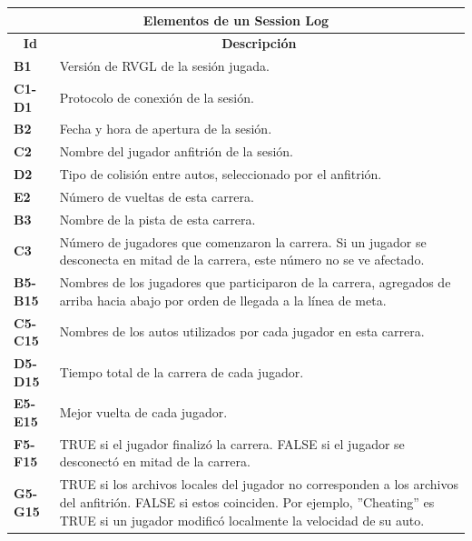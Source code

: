 \begin{center}
	\begin{tabular}{ | l | p{13cm} |}
		\hline
		\multicolumn{2}{|c|}{\textbf{Elementos de un Session Log}} \\
		\hline
		\multicolumn{1}{|c|}{\textbf{Id}} & \multicolumn{1}{|c|}{\textbf{Descripción}} \\
		\hline
		{\textbf{B1}} & Versión de RVGL de la sesión jugada. \\ \hline
		
		{\textbf{C1-D1}} & Protocolo de conexión de la sesión. \\ \hline
		
		{\textbf{B2}} & Fecha y hora de apertura de la sesión. \\ \hline
		
		{\textbf{C2}} & Nombre del jugador anfitrión de la sesión. \\ \hline
		
		{\textbf{D2}} & Tipo de colisión entre autos, seleccionado por el anfitrión. \\ \hline
		
		{\textbf{E2}} & Número de vueltas de esta carrera. \\ \hline
		
		{\textbf{B3}} & Nombre de la pista de esta carrera. \\ \hline
		
		{\textbf{C3}} & Número de jugadores que comenzaron la carrera. Si un jugador se desconecta en mitad de la carrera, este número no se ve afectado. \\ \hline
		
		{\textbf{B5-B15}} & Nombres de los jugadores que participaron de la carrera, agregados de arriba hacia abajo por orden de llegada a la línea de meta. \\ \hline
		
		{\textbf{C5-C15}} & Nombres de los autos utilizados por cada jugador en esta carrera. \\ \hline
		
		{\textbf{D5-D15}} & Tiempo total de la carrera de cada jugador.\\ \hline
		
		{\textbf{E5-E15}} & Mejor vuelta de cada jugador.\\ \hline
		
		{\textbf{F5-F15}} & TRUE si el jugador finalizó la carrera. FALSE si el jugador se desconectó en mitad de la carrera.\\ \hline
		
		{\textbf{G5-G15}} & TRUE si los archivos locales del jugador no corresponden a los archivos del anfitrión. FALSE si estos coinciden. Por ejemplo, ''Cheating'' es TRUE si un jugador modificó localmente la velocidad de su auto.\\ \hline
	\end{tabular}
    \\
\label{table:sessionlog}
\end{center}

